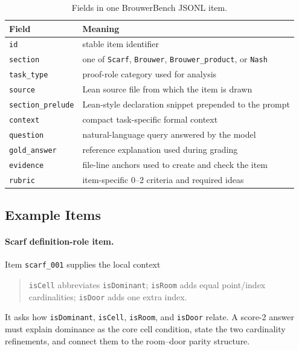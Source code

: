 \documentclass{article}
\theoremstyle{definition}
\begin{document}
\begin{table}[H]
\caption{Fields in one BrouwerBench JSONL item.}
\label{tab:appendix-dataset-schema}
\begin{center}
    \begin{small}
      \begin{tabular}{ll}
\toprule
Field & Meaning \\
\midrule
\texttt{id} & stable item identifier \\
\texttt{section} & one of \texttt{Scarf}, \texttt{Brouwer}, \texttt{Brouwer\_product}, or \texttt{Nash} \\
\texttt{task\_type} & proof-role category used for analysis \\
\texttt{source} & Lean source file from which the item is drawn \\
\texttt{section\_prelude} & Lean-style declaration snippet prepended to the prompt \\
\texttt{context} & compact task-specific formal context \\
\texttt{question} & natural-language query answered by the model \\
\texttt{gold\_answer} & reference explanation used during grading \\
\texttt{evidence} & file-line anchors used to create and check the item \\
\texttt{rubric} & item-specific 0--2 criteria and required ideas \\
\bottomrule
\end{tabular}
    \end{small}
  \end{center}
  \vskip -0.1in
\end{table}

\subsection{Example Items}

\paragraph{Scarf definition-role item.}
Item \texttt{scarf\_001} supplies the local context
\begin{quote}
\texttt{isCell} abbreviates \texttt{isDominant}; \texttt{isRoom} adds equal point/index cardinalities; \texttt{isDoor} adds one extra index.
\end{quote}
It asks how \texttt{isDominant}, \texttt{isCell}, \texttt{isRoom}, and \texttt{isDoor} relate. A score-2 answer must explain dominance as the core cell condition, state the two cardinality refinements, and connect them to the room--door parity structure.
\end{document}
